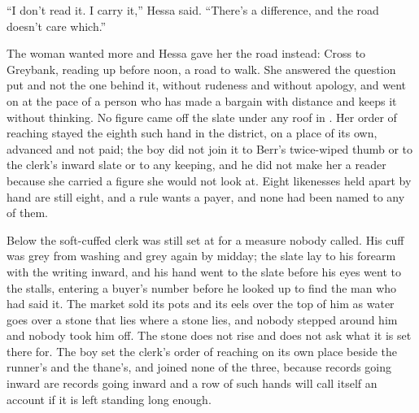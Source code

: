 “I don't read it. I carry it,” Hessa said. “There's a difference, and the road doesn't care which.”

The woman wanted more and Hessa gave her the road instead: Cross to Greybank, reading up before noon, a road to walk. She answered the question put and not the one behind it, without rudeness and without apology, and went on at the pace of a person who has made a bargain with distance and keeps it without thinking. No figure came off the slate under any roof in . Her order of reaching stayed the eighth such hand in the district, on a place of its own, advanced and not paid; the boy did not join it to Berr's twice-wiped thumb or to the clerk's inward slate or to any keeping, and he did not make her a reader because she carried a figure she would not look at. Eight likenesses held apart by hand are still eight, and a rule wants a payer, and none had been named to any of them.

Below  the soft-cuffed clerk was still set at  for a measure nobody called. His cuff was grey from washing and grey again by midday; the slate lay to his forearm with the writing inward, and his hand went to the slate before his eyes went to the stalls, entering a buyer's number before he looked up to find the man who had said it. The market sold its pots and its eels over the top of him as water goes over a stone that lies where a stone lies, and nobody stepped around him and nobody took him off. The stone does not rise and does not ask what it is set there for. The boy set the clerk's order of reaching on its own place beside the runner's and the thane's, and joined none of the three, because records going inward are records going inward and a row of such hands will call itself an account if it is left standing long enough.

